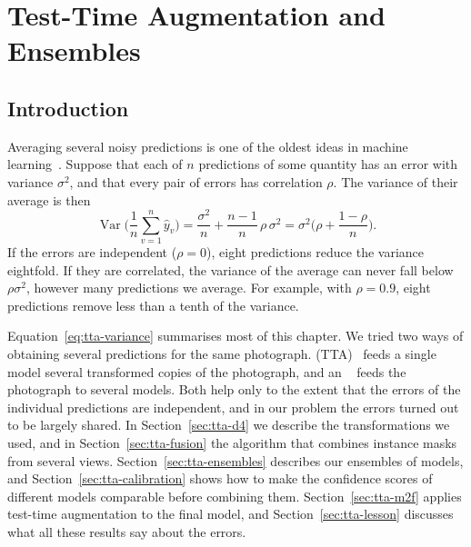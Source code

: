 \chapter{Test-Time Augmentation and Ensembles}\label{ch:tta}

\section{Introduction}\label{sec:tta-why}
Averaging several noisy predictions is one of the oldest ideas in machine
learning~\citep{dietterich2000}. Suppose that each of $n$ predictions of some quantity has an error
with variance $\sigma^2$, and that every pair of errors has correlation $\rho$. The variance of
their average is then~\citep{hastie2009}
\begin{equation}
\operatorname{Var}\Big(\frac1n\sum_{v=1}^{n}\hat y_v\Big)
= \frac{\sigma^2}{n} + \frac{n-1}{n}\,\rho\,\sigma^2
= \sigma^2\Big(\rho + \frac{1-\rho}{n}\Big).
\label{eq:tta-variance}
\end{equation}
If the errors are independent ($\rho=0$), eight predictions reduce the variance eightfold. If they
are correlated, the variance of the average can never fall below $\rho\sigma^2$, however many
predictions we average. For example, with $\rho=0.9$, eight predictions remove less than a tenth of
the variance.

Equation~\eqref{eq:tta-variance} summarises most of this chapter. We tried two ways of obtaining
several predictions for the same photograph. 
(TTA)~\citep{krizhevsky2012} feeds a single model several transformed copies of the photograph, and
an ~\citep{lakshminarayanan2017} feeds the photograph to several models. Both help only to the extent that the errors of the individual predictions are
independent, and in our problem the errors turned out to be largely shared. In
Section~\ref{sec:tta-d4} we describe the transformations we used, and in Section~\ref{sec:tta-fusion}
the algorithm that combines instance masks from several views. Section~\ref{sec:tta-ensembles}
describes our ensembles of models, and Section~\ref{sec:tta-calibration} shows how to make the
confidence scores of different models comparable before combining them.
Section~\ref{sec:tta-m2f} applies test-time augmentation to the final model, and
Section~\ref{sec:tta-lesson} discusses what all these results say about the errors.

